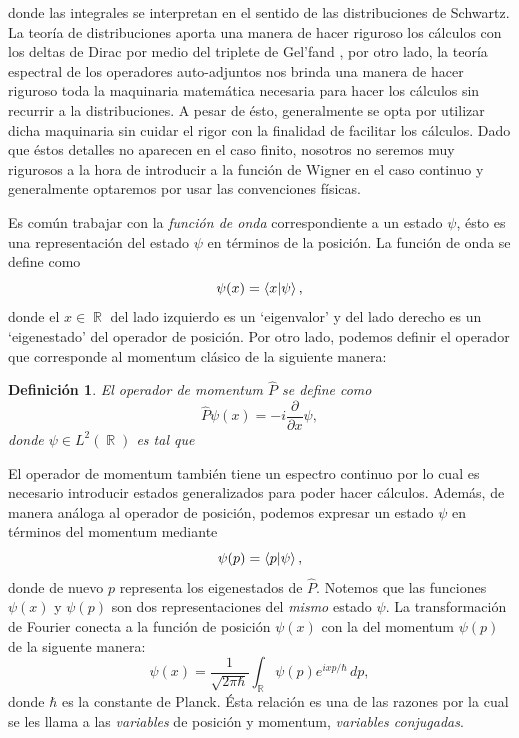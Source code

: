 \documentclass[a4paper]{report}
\DeclareMathOperator{\R}{\mathbb{R}}
\newtheorem{definition}{Definición}
\begin{document}
  donde las integrales se interpretan en el sentido de las
  distribuciones de Schwartz. La teoría de distribuciones
  aporta una manera de hacer riguroso los cálculos con los
  deltas de Dirac por medio del triplete de Gel'fand
  \cite{folland1989}, por otro lado, la teoría espectral de
  los operadores auto-adjuntos nos brinda una manera de
  hacer riguroso toda la maquinaria matemática necesaria
  para hacer los cálculos sin recurrir a la distribuciones.
  A pesar de ésto, generalmente se opta por utilizar dicha
  maquinaria sin cuidar el rigor con la finalidad de
  facilitar los cálculos. Dado que éstos detalles no
  aparecen en el caso finito, nosotros no seremos muy
  rigurosos a la hora de introducir a la función de Wigner
  en el caso continuo y generalmente optaremos por usar las
  convenciones físicas.

  Es común trabajar con la \textit{función de onda}
  correspondiente a un estado $\psi$, ésto es una
  representación del estado $\psi$ en términos de la
  posición. La función de onda se define como
  \begin{equation}
    \psi(x)
    = \braket{x| \psi},
  \end{equation} 
  donde el $x \in \R$ del lado izquierdo es un `eigenvalor'
  y del lado derecho es un `eigenestado' del operador de
  posición. Por otro lado, podemos definir el operador que
  corresponde al momentum clásico de la siguiente manera:
  \begin{definition}
    El operador de momentum $\hat P$ se define como
    \[
      \hat P\psi(x) = -i \frac{\partial}{\partial x} \psi,
    \] 
    donde $\psi \in L^2(\R)$ es tal que
  \end{definition}
  El operador de momentum también tiene un espectro continuo
  por lo cual es necesario introducir estados generalizados
  para poder hacer cálculos. Además, de manera análoga al
  operador de posición, podemos expresar un estado $\psi$ en
  términos del momentum mediante
  \begin{equation}
    \psi(p)
    = \braket{p| \psi},
  \end{equation} 
  donde de nuevo $p$ representa los eigenestados de $\hat
  P$. Notemos que las funciones $\psi(x)$ y $\psi(p)$ son
  dos representaciones del \textit{mismo} estado $\psi$.  La
  transformación de Fourier conecta a la función de posición
  $\psi(x)$ con la del momentum $\psi(p)$ de la siguente
  manera:
  \begin{equation}
    \psi(x)
    = \frac{1}{\sqrt{2\pi\hbar}} \int_{\R} \psi(p)e^{ixp /
    \hbar} \, dp,
  \end{equation} 
  donde $\hbar$ es la constante de Planck. Ésta relación es
  una de las razones por la cual se les llama a las
  \textit{variables} de posición y momentum,
  \textit{variables conjugadas}.
\end{document}
